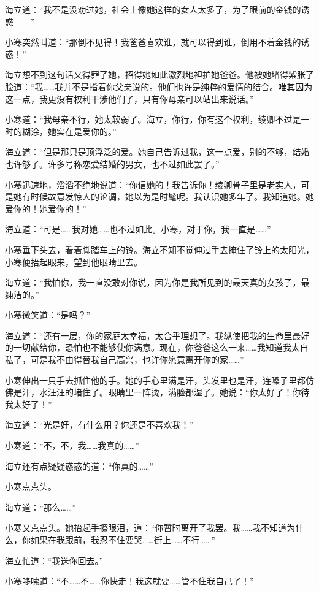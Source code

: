 \par 海立道：“我不是没劝过她，社会上像她这样的女人太多了，为了眼前的金钱的诱惑——”
\par 小寒突然叫道：“那倒不见得！我爸爸喜欢谁，就可以得到谁，倒用不着金钱的诱惑！”
\par 海立想不到这句话又得罪了她，招得她如此激烈地袒护她爸爸。他被她堵得紫胀了脸道：“我……我并不是指着你父亲说的。他们也许是纯粹的爱情的结合。唯其因为这一点，我更没有权利干涉他们了，只有你母亲可以站出来说话。”
\par 小寒道：“我母亲不行，她太软弱了。海立，你行，你有这个权利，绫卿不过是一时的糊涂，她实在是爱你的。”
\par 海立道：“但是那只是顶浮泛的爱。她自己告诉过我，这一点爱，别的不够，结婚也许够了。许多号称恋爱结婚的男女，也不过如此罢了。”
\par 小寒迅速地，滔滔不绝地说道：“你信她的！我告诉你！绫卿骨子里是老实人，可是她有时候故意发惊人的论调，她以为是时髦呢。我认识她多年了。我知道她。她爱你的！她爱你的！”
\par 海立道：“可是……我对她……也不过如此。小寒，对于你，我一直是……”
\par 小寒垂下头去，看着脚踏车上的铃。海立不知不觉伸过手去掩住了铃上的太阳光，小寒便抬起眼来，望到他眼睛里去。
\par 海立道：“我怕你，我一直没敢对你说，因为你是我所见到的最天真的女孩子，最纯洁的。”
\par 小寒微笑道：“是吗？”
\par 海立道：“还有一层，你的家庭太幸福，太合乎理想了。我纵使把我的生命里最好的一切献给你，恐怕也不能够使你满意。现在，你爸爸这么一来……我知道我太自私了，可是我不由得替我自己高兴，也许你愿意离开你的家……”
\par 小寒伸出一只手去抓住他的手。她的手心里满是汗，头发里也是汗，连嗓子里都仿佛是汗，水汪汪的堵住了。眼睛里一阵烫，满脸都湿了。她说：“你太好了！你待我太好了！”
\par 海立道：“光是好，有什么用？你还是不喜欢我！”
\par 小寒道：“不，不，我……我真的……”
\par 海立还有点疑疑惑惑的道：“你真的……”
\par 小寒点点头。
\par 海立道：“那么……”
\par 小寒又点点头。她抬起手擦眼泪，道：“你暂时离开了我罢。我……我不知道为什么，你如果在我跟前，我忍不住要哭……街上……不行……”
\par 海立忙道：“我送你回去。”
\par 小寒哆嗦道：“不……不……你快走！我这就要……管不住我自己了！”
